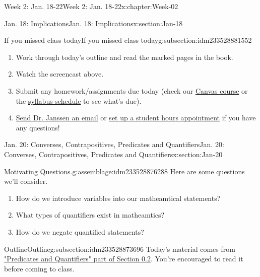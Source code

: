 \documentclass[oneside,10pt,]{book}
\numberwithin{equation}{section}
\begin{document}
\begin{chapterptx}{Week 2: Jan. 18-22}{}{Week 2: Jan. 18-22}{}{}{x:chapter:Week-02}
\begin{sectionptx}{Jan. 18: Implications}{}{Jan. 18: Implications}{}{}{x:section:Jan-18}
%
\begin{subsectionptx}{If you missed class today}{}{If you missed class today}{}{}{g:subsection:idm233528881552}
%
\begin{enumerate}
\item{}Work through today's outline and read the marked pages in the book.%
\item{}Watch the screencast above.%
\item{}Submit any homework\slash{}assignments due today (check our \href{https://dordt.instructure.com/courses/3110050}{Canvas course} or the \href{https://prof.mkjanssen.org/ds/index.html\#schedule}{syllabus schedule} to see what's due).%
\item{}\href{mailto:mike.janssen@dordt.edu}{Send Dr. Janssen an email} or \href{https://calendly.com/mkjanssen/student-hours}{set up a student hours appointment} if you have any questions!%
\end{enumerate}
\end{subsectionptx}
\end{sectionptx}
%
%
\typeout{************************************************}
\typeout{************************************************}
%
\begin{sectionptx}{Jan. 20: Converses, Contrapositives, Predicates and Quantifiers}{}{Jan. 20: Converses, Contrapositives, Predicates and Quantifiers}{}{}{x:section:Jan-20}
\begin{introduction}{}%
\begin{assemblage}{Motivating Questions.}{g:assemblage:idm233528876288}%
Here are some questions we'll consider. %
\begin{enumerate}
\item{}How do we introduce variables into our matheamtical statements?%
\item{}What types of quantifiers exist in matheamtics?%
\item{}How do we negate quantified statements?%
\end{enumerate}
%
\end{assemblage}
\end{introduction}%
%
%
\typeout{************************************************}
\typeout{************************************************}
%
\begin{subsectionptx}{Outline}{}{Outline}{}{}{g:subsection:idm233528873696}
Today's material comes from \href{http://discrete.openmathbooks.org/dmoi3/sec_intro-statements.html\#IYE}{"Predicates and Quantifiers" part of Section 0.2}. You're encouraged to read it before coming to class.%

\end{subsectionptx}
\end{sectionptx}
\end{chapterptx}
\end{document}
